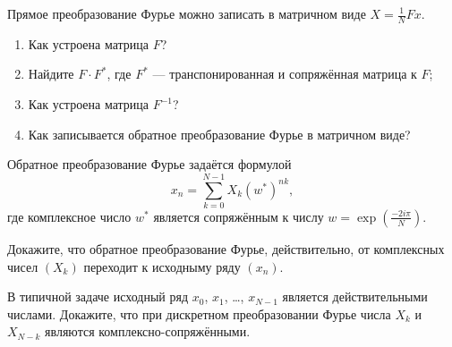 \begin{problem}
  Прямое преобразование Фурье можно записать в матричном виде $X = \frac{1}{N}Fx$.
  \begin{enumerate}
    \item Как устроена матрица $F$?
    \item Найдите $F\cdot F^{*}$, где $F^{*}$ — транспонированная и сопряжённая матрица к $F$;
    \item Как устроена матрица $F^{-1}$?
    \item Как записывается обратное преобразование Фурье в матричном виде?
  \end{enumerate}

  \begin{sol}
  \end{sol}
\end{problem}


\begin{problem}

Обратное преобразование Фурье задаётся формулой
\[
  x_n = \sum_{k=0}^{N-1} X_k (w^{*})^{nk},
\]
где комплексное число $w^{*}$ является сопряжённым к числу $w = \exp\left(\frac{-2i\pi}{N} \right)$.


  Докажите, что обратное преобразование Фурье, действительно, от комплексных чисел $(X_k)$ переходит к исходныму ряду $(x_n)$.
  \begin{sol}
  \end{sol}
\end{problem}


\begin{problem}
  В типичной задаче исходный ряд $x_0$, $x_1$, \ldots, $x_{N-1}$ является действительными числами.
  Докажите, что при дискретном преобразовании Фурье числа $X_k$ и $X_{N-k}$ являются комплексно-сопряжёнными.

  \begin{sol}
  \end{sol}
\end{problem}



